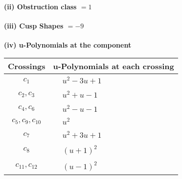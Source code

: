 \documentclass[1p]{elsarticle_modified}
\theoremstyle{definition}
\begin{document}
\flushleft \textbf{(ii) Obstruction class $= 1$}\\~\\
\flushleft \textbf{(iii) Cusp Shapes $= -9$}\\~\\
\newpage\renewcommand{\arraystretch}{1}
\flushleft \textbf{(iv) u-Polynomials at the component}\newline \\
\begin{tabular}{m{50pt}|m{274pt}}
Crossings & \hspace{64pt}u-Polynomials at each crossing \\
\hline $$\begin{aligned}c_{1}\end{aligned}$$&$\begin{aligned}
&u^2-3 u+1
\end{aligned}$\\
\hline $$\begin{aligned}c_{2},c_{3}\end{aligned}$$&$\begin{aligned}
&u^2+u-1
\end{aligned}$\\
\hline $$\begin{aligned}c_{4},c_{6}\end{aligned}$$&$\begin{aligned}
&u^2- u-1
\end{aligned}$\\
\hline $$\begin{aligned}c_{5},c_{9},c_{10}\end{aligned}$$&$\begin{aligned}
&u^2
\end{aligned}$\\
\hline $$\begin{aligned}c_{7}\end{aligned}$$&$\begin{aligned}
&u^2+3 u+1
\end{aligned}$\\
\hline $$\begin{aligned}c_{8}\end{aligned}$$&$\begin{aligned}
&(u+1)^2
\end{aligned}$\\
\hline $$\begin{aligned}c_{11},c_{12}\end{aligned}$$&$\begin{aligned}
&(u-1)^2
\end{aligned}$\\
\hline
\end{tabular}\\~\\
\end{document}
